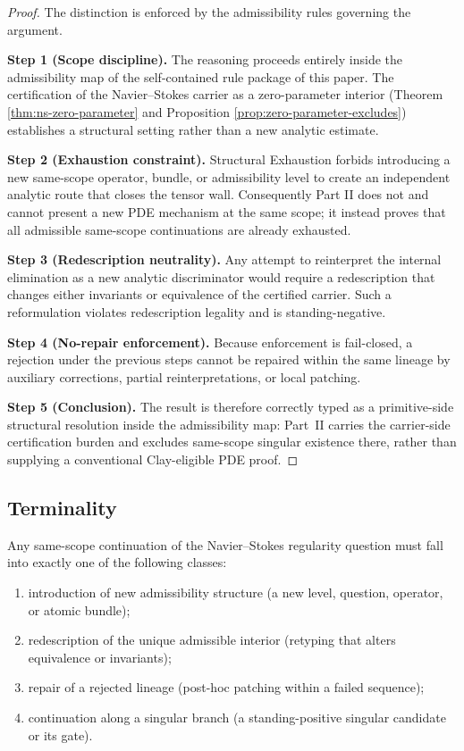 \begin{proof}
The distinction is enforced by the admissibility rules governing the argument.

\textbf{Step 1 (Scope discipline).} The reasoning proceeds entirely inside the admissibility map of
the self-contained rule package of this paper. The certification of the Navier--Stokes carrier as a zero-parameter interior
(Theorem \ref{thm:ns-zero-parameter} and Proposition \ref{prop:zero-parameter-excludes}) establishes a
structural setting rather than a new analytic estimate.

\textbf{Step 2 (Exhaustion constraint).} Structural Exhaustion forbids introducing a new same-scope
operator, bundle, or admissibility level to create an independent analytic route that closes the
tensor wall. Consequently Part II does not and cannot present a new PDE mechanism at the same scope;
it instead proves that all admissible same-scope continuations are already exhausted.

\textbf{Step 3 (Redescription neutrality).} Any attempt to reinterpret the internal elimination as a
new analytic discriminator would require a redescription that changes either invariants or
equivalence of the certified carrier. Such a reformulation violates redescription legality and is
standing-negative.

\textbf{Step 4 (No-repair enforcement).} Because enforcement is fail-closed, a rejection under the
previous steps cannot be repaired within the same lineage by auxiliary corrections, partial
reinterpretations, or local patching.

\textbf{Step 5 (Conclusion).} The result is therefore correctly typed as a primitive-side structural resolution inside the admissibility map: Part~II carries the carrier-side certification burden and excludes same-scope singular existence there, rather than supplying a conventional Clay-eligible PDE proof.
\end{proof}

\subsection{Terminality}
\begin{lemma}\label{lem:move-classification}
Any same-scope continuation of the Navier--Stokes regularity question must fall into exactly one of
the following classes:
\begin{enumerate}[label=(\roman*), leftmargin=2.2em]
\item introduction of new admissibility structure (a new level, question, operator, or atomic bundle);
\item redescription of the unique admissible interior (retyping that alters equivalence or invariants);
\item repair of a rejected lineage (post-hoc patching within a failed sequence);
\item continuation along a singular branch (a standing-positive singular candidate or its gate).
\end{enumerate}
\end{lemma}

